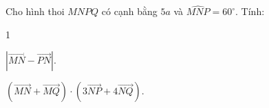 \TL
\begin{ex}
Cho hình thoi $MNPQ$ có cạnh bằng $5a$ và $\widehat{MNP}=60^\circ$. Tính:
\begin{enumEX}[a)]{1}
\item $|\overrightarrow{MN}-\overrightarrow{PN}|$.
\item $(\overrightarrow{MN}+\overrightarrow{MQ})\cdot(3 \overrightarrow{NP}+4\overrightarrow{NQ})$.
\end{enumEX}
\end{ex}
